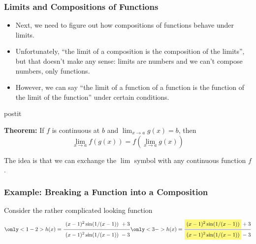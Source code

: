 \documentclass[serif,ignorenonframetext]{beamer}
\newcommand{\ds}{\displaystyle}
\begin{document}
\begin{frame}
  \frametitle{Limits and Compositions of Functions}
  \begin{itemize}
  \item Next, we need to figure out how compositions of functions behave
    under limits.  
    \pause
  \item Unfortunately, ``the limit of a composition is the composition
    of the limits'', but that doesn't make any sense: limits are numbers
    and we can't compose numbers, only functions.
    \pause
  \item However, we can say ``the limit of a function of a function
    is the function of the limit of the function'' under certain conditions.
  \end{itemize}
  \pause
  \begin{beamercolorbox}{postit} 

  \textbf{Theorem:} If $f$ is continuous at $b$ and 
  $\ds \lim_{x\to a} g(x) = b$, then
  \begin{displaymath}
    \lim_{x\to a} f(g(x)) = f(\lim_{x\to a} g(x))
  \end{displaymath}

  \end{beamercolorbox}
  \pause
  The idea is that we can exchange the $\lim$ symbol with any
  continuous function $f$.
\end{frame}

\begin{frame}
  \frametitle{Example: Breaking a Function into a Composition}
  Consider the rather complicated looking function
  \begin{displaymath}
    \only<1-2>{
      h(x) = \frac{
        \tikz[baseline=(t1.base)]{
          \node[fill=white!50] (t1)
          {$(x-1)^2\sin(1/(x-1))$};
        } + 3
      }%
      {
        \tikz[baseline=(t2.base)]{
          \node[fill=white!50] (t2)
	  {$(x-1)^2\sin(1/(x-1))$};
        } - 3
      }
    } %
    \only<3->{
    h(x) = \frac{
      \tikz[baseline=(t3.base)]{
        \node[fill=yellow!50] (t3)
        {$(x-1)^2\sin(1/(x-1))$};
      } + 3
    }%
    {
      \tikz[baseline=(t4.base)]{
        \node[fill=yellow!50] (t4)
	{$(x-1)^2\sin(1/(x-1))$};
      } - 3
    }
    } %
  \end{displaymath}
\end{frame}
\end{document}
